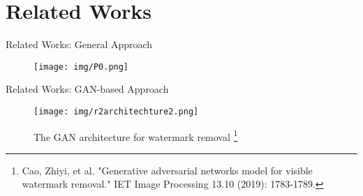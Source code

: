 \section{Related Works}





\begin{frame}{Related Works: General Approach}
    \begin{figure}
        \centering
        \texttt{[image: img/P0.png]}
    \end{figure}
\end{frame}


\begin{frame}{Related Works: GAN-based Approach}
   \begin{figure}
       \centering
       \texttt{[image: img/r2architechture2.png]}
       \caption{The GAN architecture for watermark removal \footnote{\scriptsize Cao, Zhiyi, et al. "Generative adversarial networks model for visible watermark removal." IET Image Processing 13.10 (2019): 1783-1789.}}
   \end{figure}
\end{frame}

